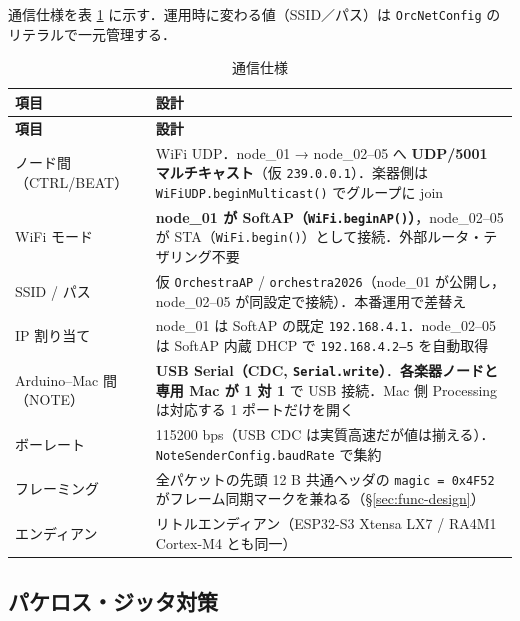 \documentclass[lualatex,book,paper=a4paper,jafontsize=11.5pt,jafontscale=1.05]{jlreq}
\begin{document}
通信仕様を表 \ref{tab:net-spec} に示す．運用時に変わる値（SSID／パス）は
\texttt{OrcNetConfig} のリテラルで一元管理する．

\begin{longtable}{p{} p{}}
\caption{通信仕様}\label{tab:net-spec}\\
\toprule
\textbf{項目} & \textbf{設計} \\
\midrule
\endfirsthead
\toprule
\textbf{項目} & \textbf{設計} \\
\midrule
\endhead
ノード間（CTRL/BEAT）    & WiFi UDP．node\_01 → node\_02--05 へ \textbf{UDP/5001 マルチキャスト}（仮 \texttt{239.0.0.1}）．楽器側は \texttt{WiFiUDP.beginMulticast()} でグループに join \\
WiFi モード              & \textbf{node\_01 が SoftAP（\texttt{WiFi.beginAP()}）}，node\_02--05 が STA（\texttt{WiFi.begin()}）として接続．外部ルータ・テザリング不要 \\
SSID / パス             & 仮 \texttt{OrchestraAP} / \texttt{orchestra2026}（node\_01 が公開し，node\_02--05 が同設定で接続）．本番運用で差替え \\
IP 割り当て              & node\_01 は SoftAP の既定 \texttt{192.168.4.1}．node\_02--05 は SoftAP 内蔵 DHCP で \texttt{192.168.4.2--5} を自動取得 \\
Arduino--Mac 間（NOTE）  & \textbf{USB Serial（CDC, \texttt{Serial.write}）}．\textbf{各楽器ノードと専用 Mac が 1 対 1} で USB 接続．Mac 側 Processing は対応する 1 ポートだけを開く \\
ボーレート               & 115200 bps（USB CDC は実質高速だが値は揃える）．\texttt{NoteSenderConfig.baudRate} で集約 \\
フレーミング             & 全パケットの先頭 12 B 共通ヘッダの \texttt{magic = 0x4F52} がフレーム同期マークを兼ねる（\S\ref{sec:func-design}） \\
エンディアン             & リトルエンディアン（ESP32-S3 Xtensa LX7 / RA4M1 Cortex-M4 とも同一） \\
\bottomrule
\end{longtable}

\subsection{パケロス・ジッタ対策}
\end{document}
